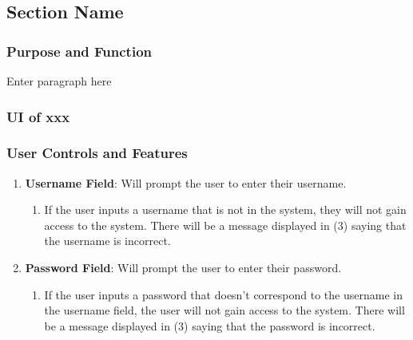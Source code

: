 
\newpage
\subsection{Section Name}\label{subsection:signIn}

\subsubsection{Purpose and Function}
Enter paragraph here

\subsubsection{UI of xxx} 


\subsubsection{User Controls and Features}
\begin{enumerate}
    \item \textbf{Username Field}: Will prompt the user to enter their username. 
    \begin{enumerate}
        \item If the user inputs a username that is not in the system, they will not gain access to the system. 
            There will be a message displayed in (3) saying that the username is incorrect.
        \end{enumerate}
    \item \textbf{Password Field}: Will prompt the user to enter their password.
        \begin{enumerate}
            \item If the user inputs a password that doesn’t correspond to the username in the username field, the user will not gain access to the system. 
            There will be a message displayed in (3) saying that the password is incorrect.
        \end{enumerate}
\end{enumerate}
